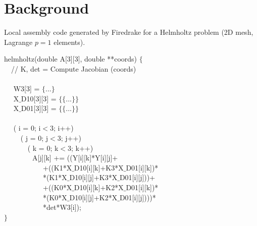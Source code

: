 \documentclass[conference]{IEEEtran}
\begin{document}


\section{Background}
\label{sec:background}
\begin{algorithm}[t]
\small
\caption{Local assembly code generated by Firedrake for a Helmholtz problem (2D mesh, Lagrange $p=1$ elements).}
\label{code:helmholtz}
 helmholtz(double A[3][3], double **coords) $\lbrace$\\
~~// K, det = Compute Jacobian (coords) \\
~~\\
~~ W3[3] = $\lbrace$...$\rbrace$\\
~~ X$\_$D10[3][3] = $\lbrace\lbrace$...$\rbrace\rbrace$\\
~~ X$\_$D01[3][3] = $\lbrace\lbrace$...$\rbrace\rbrace$\\
~~\\
~~ ( i = 0; i$<$3; i++) \\
~~~~ ( j = 0; j$<$3; j++) \\
~~~~~~ ( k = 0; k$<$3; k++) \\
~~~~~~~~A[j][k] += ((Y[i][k]*Y[i][j]+\\
~~~~~~~~~~~+((K1*X$\_$D10[i][k]+K3*X$\_$D01[i][k])*\\
~~~~~~~~~~~*(K1*X$\_$D10[i][j]+K3*X$\_$D01[i][j]))+\\
~~~~~~~~~~~+((K0*X$\_$D10[i][k]+K2*X$\_$D01[i][k])*\\
~~~~~~~~~~~*(K0*X$\_$D10[i][j]+K2*X$\_$D01[i][j])))*\\
~~~~~~~~~~~*det*W3[i]);\\
$\rbrace$
\end{algorithm}
\end{document}

